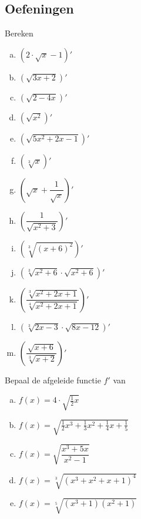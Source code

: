 \documentclass[12pt]{article}
\begin{document}
\begin{theorie}
\subsection{Oefeningen}

\end{theorie}

\begin{oefening}
Bereken
\begin{multicols}{2}
\begin{enumerate}[(a)]
  \itemsep0.5em
  \item $\displaystyle\left(2\cdot\sqrt{x}-1\right)'$
  \item $\displaystyle\left(\sqrt{3x+2}\right)'$
  \item $\displaystyle\left(\sqrt{2-4x}\right)'$
  \item $\displaystyle\left(\sqrt{x^2}\right)'$
  \item $\displaystyle\left(\sqrt{5x^2+2x-1}\right)'$
  \item $\displaystyle\left(\sqrt[3]{x}\right)'$
  \item $\displaystyle\left(\sqrt{x}+\dfrac{1}{\sqrt{x}}\right)'$
  \item $\displaystyle\left(\dfrac{1}{\sqrt{x^2+3}}\right)'$
  \item $\displaystyle\left(\sqrt[3]{\left(x+6\right)^2}\right)'$
  \item $\displaystyle\left(\sqrt[3]{x^2+6}\cdot\sqrt{x^2+6}\right)'$
  \item $\displaystyle\left(\dfrac{\sqrt[3]{x^2+2x+1}}{\sqrt[4]{x^2+2x+1}}\right)'$
  \item $\displaystyle\left(\sqrt[3]{2x-3}\cdot\sqrt{8x-12}\right)'$
  \item $\displaystyle\left(\dfrac{\sqrt{x+6}}{\sqrt[3]{x+2}}\right)'$
\end{enumerate}
\end{multicols}
\end{oefening}

\begin{oefening}
Bepaal de afgeleide functie $f'$ van\\
\begin{enumerate}[(a)]
  \itemsep0.5em
  \item $\displaystyle f(x)=4\cdot\sqrt{\frac{1}{2}x}$
  \item $\displaystyle f(x)=\sqrt{\frac{1}{2}x^3+\frac{1}{3}x^2+\frac{1}{4}x+\frac{1}{5}}$
  \item $\displaystyle f(x)=\sqrt{\dfrac{x^3+5x}{x^2-1}}$
  \item $\displaystyle f(x)=\sqrt[3]{\left(x^3+x^2+x+1\right)^4}$
  \item $\displaystyle f(x)=\sqrt[5]{\left(x^3+1\right)\left(x^2+1\right)}$
\end{enumerate}
\end{oefening}
\end{document}
